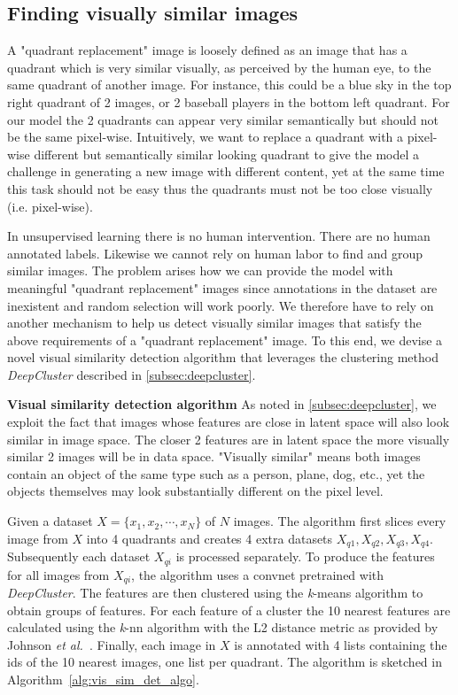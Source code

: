 \documentclass[12pt,a4paper]{article}
\begin{document}
\subsection{Finding visually similar images} \label{subsec:img_clustering}
A "quadrant replacement" image is loosely defined as an image that has a quadrant which is very similar visually, as perceived by the human eye, to the same quadrant of another image. For instance, this could be a blue sky in the top right quadrant of 2 images, or 2 baseball players in the bottom left quadrant. For our model the 2 quadrants can appear very similar semantically but should not be the same pixel-wise. Intuitively, we want to replace a quadrant with a pixel-wise different but semantically similar looking quadrant to give the model a challenge in generating a new image with different content, yet at the same time this task should not be easy thus the quadrants must not be too close visually (i.e. pixel-wise).

In unsupervised learning there is no human intervention. There are no human annotated labels. Likewise we cannot rely on human labor to find and group similar images. The problem arises how we can provide the model with meaningful "quadrant replacement" images since annotations in the dataset are inexistent and random selection will work poorly. We therefore have to rely on another mechanism to help us detect visually similar images that satisfy the above requirements of a "quadrant replacement" image. To this end, we devise a novel visual similarity detection algorithm that leverages the clustering method \textit{DeepCluster} described in \ref{subsec:deepcluster}.

\textbf{Visual similarity detection algorithm} As noted in \ref{subsec:deepcluster}, we exploit the fact that images whose features are close in latent space will also look similar in image space. The closer 2 features are in latent space the more visually similar 2 images will be in data space. "Visually similar" means both images contain an object of the same type such as a person, plane, dog, etc., yet the objects themselves may look substantially different on the pixel level.

Given a dataset $X = \{x_1,x_2,\cdots,x_N\}$ of $N$ images. The algorithm first slices every image from $X$ into 4 quadrants and creates 4 extra datasets $X_{q1}, X_{q2}, X_{q3}, X_{q4}$. Subsequently each dataset $X_{qi}$ is processed separately. To produce the features for all images from $X_{qi}$, the algorithm uses a convnet pretrained with \textit{DeepCluster}. The features are then clustered using the \textit{k}-means algorithm to obtain groups of features. For each feature of a cluster the 10 nearest features are calculated using the \textit{k}-nn algorithm with the L2 distance metric as provided by Johnson \textit{et al.}~\cite{FaissKnn}. Finally, each image in $X$ is annotated with 4 lists containing the ids of the 10 nearest images, one list per quadrant. The algorithm is sketched in Algorithm~\ref{alg:vis_sim_det_algo}.
\end{document}
